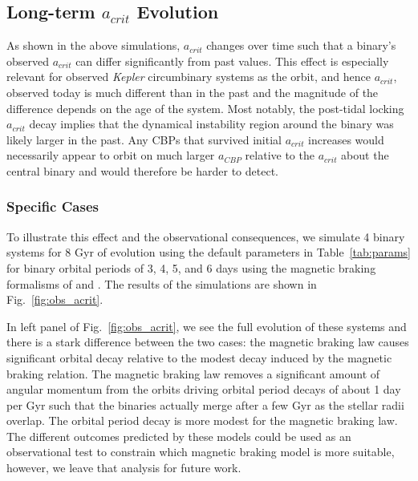 \subsection{Long-term $a_{crit}$ Evolution} \label{sec:obs_acrit}

As shown in the above simulations, $a_{crit}$ changes over time such that a binary's observed $a_{crit}$ can differ significantly from past values.  This effect is especially relevant for observed {\it Kepler} circumbinary systems as the orbit, and hence $a_{crit}$, observed today is much different than in the past and the magnitude of the difference depends on the age of the system.  Most notably, the post-tidal locking $a_{crit}$ decay implies that the dynamical instability region around the binary was likely larger in the past.  Any CBPs that survived initial $a_{crit}$ increases would necessarily appear to orbit on much larger $a_{CBP}$ relative to the $a_{crit}$ about the central binary and would therefore be harder to detect.

\subsubsection{Specific Cases}

To illustrate this effect and the observational consequences, we simulate 4 binary systems for 8 Gyr of evolution using the default parameters in Table~\ref{tab:params} for binary orbital periods of 3, 4, 5, and 6 days using the magnetic braking formalisms of \citet{Reiners2012} and \citet{Repetto2014}.  The results of the simulations are shown in Fig.~\ref{fig:obs_acrit}.

In left panel of Fig.~\ref{fig:obs_acrit}, we see the full evolution of these systems and there is a stark difference between the two cases: the \citet{Reiners2012} magnetic braking law causes significant orbital decay relative to the modest decay induced by the \citet{Repetto2014} magnetic braking relation.  The \citet{Reiners2012} magnetic braking law removes a significant amount of angular momentum from the orbits driving orbital period decays of about 1 day per Gyr such that the binaries actually merge after a few Gyr as the stellar radii overlap.  The orbital period decay is more modest for the \citet{Repetto2014} magnetic braking law.  The different outcomes predicted by these models could be used as an observational test to constrain which magnetic braking model is more suitable, however, we leave that analysis for future work.

